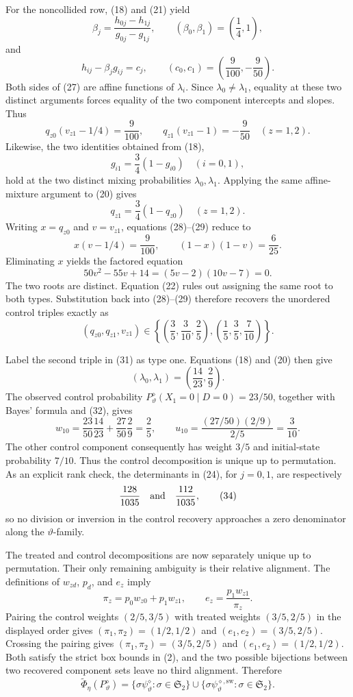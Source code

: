 For the noncollided row, (18) and (21) yield
\[
 \beta_j=\frac{h_{0j}-h_{1j}}{g_{0j}-g_{1j}},
 \qquad (\beta_0,\beta_1)=\left(\frac14,1\right),
 \tag{26}
\]
and
\[
 h_{ij}-\beta_jg_{ij}=c_j,
 \qquad (c_0,c_1)=\left(\frac9{100},-\frac9{50}\right).
 \tag{27}
\]
Both sides of (27) are affine functions of \(\lambda_i\).  Since \(\lambda_0\ne\lambda_1\), equality at these two distinct arguments forces equality of the two component intercepts and slopes.  Thus
\[
 q_{z0}(v_{z1}-1/4)=\frac9{100},
 \qquad
 q_{z1}(v_{z1}-1)=-\frac9{50}
 \quad(z=1,2).
 \tag{28}
\]
Likewise, the two identities obtained from (18),
\[
 g_{i1}=\frac34(1-g_{i0})\quad(i=0,1),
\]
hold at the two distinct mixing probabilities \(\lambda_0,\lambda_1\).  Applying the same affine-mixture argument to (20) gives
\[
 q_{z1}=\frac34(1-q_{z0})\quad(z=1,2).
 \tag{29}
\]
Writing \(x=q_{z0}\) and \(v=v_{z1}\), equations (28)--(29) reduce to
\[
 x(v-1/4)=\frac9{100},
 \qquad
 (1-x)(1-v)=\frac6{25}.
\]
Eliminating \(x\) yields the factored equation
\[
 50v^2-55v+14=(5v-2)(10v-7)=0.
 \tag{30}
\]
The two roots are distinct.  Equation (22) rules out assigning the same root to both types.  Substitution back into (28)--(29) therefore recovers the unordered control triples exactly as
\[
 (q_{z0},q_{z1},v_{z1})
 \in\left\{
 \left(\frac35,\frac3{10},\frac25\right),
 \left(\frac15,\frac35,\frac7{10}\right)
 \right\}.
 \tag{31}
\]

Label the second triple in (31) as type one.  Equations (18) and (20) then give
\[
 (\lambda_0,\lambda_1)=\left(\frac{14}{23},\frac29\right).
 \tag{32}
\]
The observed control probability \(P^{\diamond}_{\vartheta}(X_1=0\mid D=0)=23/50\), together with Bayes' formula and (32), gives
\[
 w_{10}=\frac{23}{50}\frac{14}{23}+\frac{27}{50}\frac29=\frac25,
 \qquad
 u_{10}=\frac{(27/50)(2/9)}{2/5}=\frac3{10}.
 \tag{33}
\]
The other control component consequently has weight \(3/5\) and initial-state probability \(7/10\).  Thus the control decomposition is unique up to permutation.  As an explicit rank check, the determinants in (24), for \(j=0,1\), are respectively
\[
 \frac{128}{1035}\quad\hbox{and}\quad\frac{112}{1035},
 \tag{34}
\]
so no division or inversion in the control recovery approaches a zero denominator along the \(\vartheta\)-family.

The treated and control decompositions are now separately unique up to permutation.  Their only remaining ambiguity is their relative alignment.  The definitions of \(w_{zd}\), \(p_d\), and \(e_z\) imply
\[
 \pi_z=p_0w_{z0}+p_1w_{z1},
 \qquad
 e_z=\frac{p_1w_{z1}}{\pi_z}.
 \tag{35}
\]
Pairing the control weights \((2/5,3/5)\) with treated weights \((3/5,2/5)\) in the displayed order gives \((\pi_1,\pi_2)=(1/2,1/2)\) and \((e_1,e_2)=(3/5,2/5)\).  Crossing the pairing gives \((\pi_1,\pi_2)=(3/5,2/5)\) and \((e_1,e_2)=(1/2,1/2)\).  Both satisfy the strict box bounds in (2), and the two possible bijections between two recovered component sets leave no third alignment.  Therefore
\[
 \widetilde\Phi_\eta(P^{\diamond}_{\vartheta})
 =\{\sigma\psi^{\diamond}_{\vartheta}:\sigma\in\mathfrak S_2\}
 \cup
 \{\sigma\psi^{\diamond,\mathrm{sw}}_{\vartheta}:\sigma\in\mathfrak S_2\}.
 \tag{36}
\]


